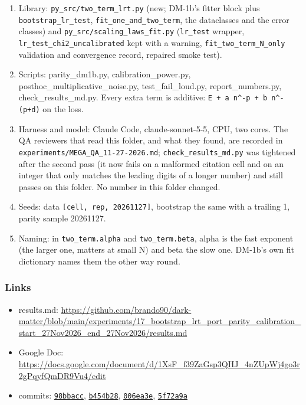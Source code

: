 \begin{enumerate}
  \item Library: \texttt{py\_\allowbreak{}src/\allowbreak{}two\_\allowbreak{}term\_\allowbreak{}lrt.py} (new; DM-1b's fitter block plus \texttt{bootstrap\_\allowbreak{}lr\_\allowbreak{}test}, \texttt{fit\_\allowbreak{}one\_\allowbreak{}and\_\allowbreak{}two\_\allowbreak{}term}, the dataclasses and the error classes) and \texttt{py\_\allowbreak{}src/\allowbreak{}scaling\_\allowbreak{}laws\_\allowbreak{}fit.py} (\texttt{lr\_\allowbreak{}test} wrapper, \texttt{lr\_\allowbreak{}test\_\allowbreak{}chi2\_\allowbreak{}uncalibrated} kept with a warning, \texttt{fit\_\allowbreak{}two\_\allowbreak{}term\_\allowbreak{}N\_\allowbreak{}only} validation and convergence record, repaired smoke test).
  \item Scripts: parity\_dm1b.py, calibration\_power.py, posthoc\_multiplicative\_noise.py, test\_fail\_loud.py, report\_numbers.py, check\_results\_md.py. Every extra term is additive: \texttt{E + a n\textasciicircum{}-p + b n\textasciicircum{}-(p+d)} on the loss.
  \item Harness and model: Claude Code, claude-sonnet-5-5, CPU, two cores. The QA reviewers that read this folder, and what they found, are recorded in \texttt{experiments/\allowbreak{}MEGA\_\allowbreak{}QA\_\allowbreak{}11-27-2026.md}; \texttt{check\_\allowbreak{}results\_\allowbreak{}md.py} was tightened after the second pass (it now fails on a malformed citation cell and on an integer that only matches the leading digits of a longer number) and still passes on this folder. No number in this folder changed.
  \item Seeds: data \texttt{[cell, rep, 20261127]}, bootstrap the same with a trailing 1, parity sample 20261127.
  \item Naming: in \texttt{two\_\allowbreak{}term.alpha} and \texttt{two\_\allowbreak{}term.beta}, alpha is the fast exponent (the larger one, matters at small N) and beta the slow one. DM-1b's own fit dictionary names them the other way round.
\end{enumerate}

\subsubsection*{Links}
\begin{itemize}\raggedright
  \item results.md: \url{https://github.com/brando90/dark-matter/blob/main/experiments/17_bootstrap_lrt_port_parity_calibration_start_27Nov2026_end_27Nov2026/results.md}
  \item Google Doc: \url{https://docs.google.com/document/d/1XsF_f39ZaGsp3QHJ_4nZUpWj4go3r2gPqyfQmDR9Vu4/edit}
  \item commits: \href{https://github.com/brando90/dark-matter/commit/98bbacc}{\texttt{98bbacc}}, \href{https://github.com/brando90/dark-matter/commit/b454b28}{\texttt{b454b28}}, \href{https://github.com/brando90/dark-matter/commit/006ea3e}{\texttt{006ea3e}}, \href{https://github.com/brando90/dark-matter/commit/5f72a9a}{\texttt{5f72a9a}}
\end{itemize}
